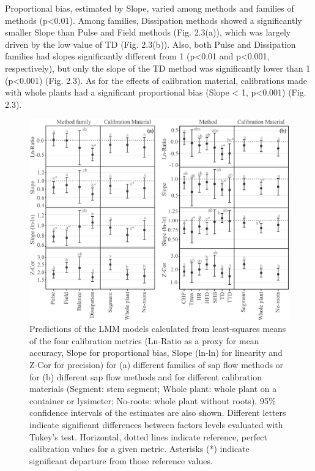 \documentclass[11pt,twoside]{reedthesis}
\begin{document}
Proportional bias, estimated by Slope, varied among methods and families
of methods (p\textless{}0.01). Among families, Dissipation methods
showed a significantly smaller Slope than Pulse and Field methods (Fig.
2.3(a)), which was largely driven by the low value of TD (Fig. 2.3(b)).
Also, both Pulse and Dissipation families had slopes significantly
different from 1 (p\textless{}0.01 and p\textless{}0.001, respectively),
but only the slope of the TD method was significantly lower than 1
(p\textless{}0.001) (Fig. 2.3). As for the effects of calibration
material, calibrations made with whole plants had a significant
proportional bias (Slope \textless{} 1, p\textless{}0.001) (Fig. 2.3).
\begin{figure}[p]

{\centering \includegraphics[width=1\linewidth]{figure/CH2/FAMILYMETHODS} 

}

\caption[Predictions of the LMM models of the four calibration metrics.]{Predictions of the LMM models calculated from least-squares means of the four calibration metrics (Ln-Ratio as a proxy for mean accuracy, Slope for proportional bias, Slope (ln-ln) for linearity and Z-Cor for precision) for (a) different families of sap flow methods or for (b) different sap flow methods and for different calibration materials (Segment: stem segment; Whole plant: whole plant on a container or lysimeter; No-roots: whole plant without roots). 95\% confidence intervals of the estimates are also shown. Different letters indicate significant differences between factors levels evaluated with Tukey's test. Horizontal, dotted lines indicate reference, perfect calibration values for a given metric. Asterisks (*) indicate significant departure from those reference values.}\label{fig:ch2fig3}
\end{figure}
\end{document}

